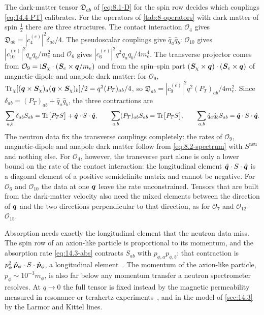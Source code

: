 The dark-matter tensor $\mathfrak{D}_{ab}$ of \cref{eq:8.1-D} for the spin row decides which couplings \cref{eq:14.4-PT} calibrates. For the operators of \cref{tab:8-operators} with dark matter of spin $\frac12$ there are three structures. The contact interaction $\mathcal{O}_4$ gives $\mathfrak{D}_{ab} = |c_4^{(e)}|^2\delta_{ab}/4$. The pseudoscalar couplings give $\hat q_a\hat q_b$: $\mathcal{O}_{10}$ gives $|c_{10}^{(e)}|^2q_aq_b/m_e^2$ and $\mathcal{O}_6$ gives $|c_6^{(e)}|^2q^2q_aq_b/4m_e^4$. The transverse projector comes from $\mathcal{O}_9 = \mathrm{i}\bm{S}_\chi\cdot(\bm{S}_e\times\bm{q}/m_e)$ and from the spin--spin part $(\bm{S}_\chi\times\bm{q})\cdot(\bm{S}_e\times\bm{q})$ of magnetic-dipole and anapole dark matter: for $\mathcal{O}_9$, $\operatorname{Tr}_\chi[(\bm{q}\times\bm{S}_\chi)_a(\bm{q}\times\bm{S}_\chi)_b]/2 = q^2(P_T)_{ab}/4$, so $\mathfrak{D}_{ab} = |c_9^{(e)}|^2q^2(P_T)_{ab}/4m_e^2$. Since $\delta_{ab} = (P_T)_{ab} + \hat q_a\hat q_b$, the three contractions are
\begin{equation}
  \sum_{a,b}\delta_{ab}S_{ab} = \operatorname{Tr}\bigl[P_TS\bigr] + \hat{\bm{q}}\cdot S\cdot\hat{\bm{q}}, \qquad \sum_{a,b}(P_T)_{ab}S_{ab} = \operatorname{Tr}\bigl[P_TS\bigr], \qquad \sum_{a,b}\hat q_a\hat q_bS_{ab} = \hat{\bm{q}}\cdot S\cdot\hat{\bm{q}} .
  \label{eq:14.4-split}
\end{equation}
The neutron data fix the transverse couplings completely: the rates of $\mathcal{O}_9$, magnetic-dipole and anapole dark matter follow from \cref{eq:8.2-spectrum} with $S^{\mathrm{neu}}$ and nothing else. For $\mathcal{O}_4$, however, the transverse part alone is only a lower bound on the rate of the contact interaction: the longitudinal element $\hat{\bm{q}}\cdot S\cdot\hat{\bm{q}}$ is a diagonal element of a positive semidefinite matrix and cannot be negative. For $\mathcal{O}_6$ and $\mathcal{O}_{10}$ the data at one $\bm{q}$ leave the rate unconstrained. Tensors that are built from the dark-matter velocity also need the mixed elements between the direction of $\bm{q}$ and the two directions perpendicular to that direction, as for $\mathcal{O}_7$ and $\mathcal{O}_{12}$--$\mathcal{O}_{15}$.

Absorption needs exactly the longitudinal element that the neutron data miss. The spin row of an axion-like particle is proportional to its momentum, and the absorption rate \cref{eq:14.3-abs} contracts $S_{ab}$ with $p_{\phi,a}p_{\phi,b}$: that contraction is $p_\phi^2\,\hat{\bm{p}}_\phi\cdot S\cdot\hat{\bm{p}}_\phi$, a longitudinal element~\cite[Eqs.~(15), (17)]{berlin2025determining}. The momentum of the axion-like particle, $p_\phi \sim 10^{-3}m_\phi$, is also far below any momentum transfer a neutron spectrometer resolves. At $q \to 0$ the full tensor is fixed instead by the magnetic permeability measured in resonance or terahertz experiments~\cite[footnote~3]{berlin2025determining}, and in the model of \cref{sec:14.3} by the Larmor and Kittel lines.

